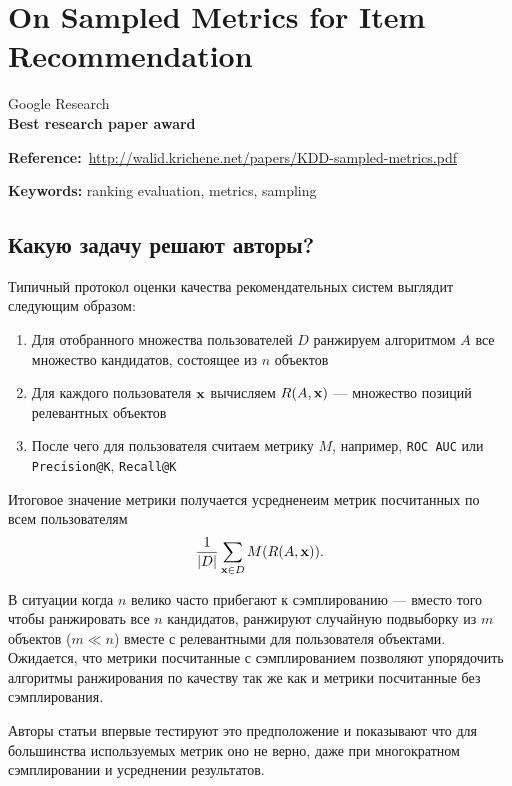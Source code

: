 \chapter{On Sampled Metrics for Item Recommendation}

Google Research \\

\textbf{Best research paper award}

\textbf{Reference:}~\url{http://walid.krichene.net/papers/KDD-sampled-metrics.pdf}

\textbf{Keywords:} ranking evaluation, metrics, sampling

\section*{Какую задачу решают авторы?}

Типичный протокол оценки качества рекомендательных систем выглядит следующим образом:
\begin{enumerate}
    \item Для отобранного множества пользователей $D$ ранжируем алгоритмом $A$ все множество кандидатов, состоящее из $n$ объектов
    \item Для каждого пользователя ${\bf x}$ вычисляем $R(A, {\bf x})$ --- множество позиций релевантных объектов
    \item После чего для пользователя считаем метрику $M$, например, \texttt{ROC AUC} или \texttt{Precision@K}, \texttt{Recall@K}
\end{enumerate}

Итоговое значение метрики получается усредненеим метрик посчитанных по всем пользователям
\begin{equation*}
    \frac{1}{|D|}\sum\limits_{{\bf x} \in D} M(R(A, {\bf x})) .
\end{equation*}

В ситуации когда $n$ велико часто прибегают к сэмплированию --- вместо того чтобы ранжировать все $n$ кандидатов, ранжируют случайную подвыборку из $m$ объектов ($ m \ll n $) вместе с релевантными для пользователя объектами. \\

Ожидается, что метрики посчитанные с сэмплированием позволяют упорядочить алгоритмы ранжирования по качеству так же как и метрики посчитанные без сэмплирования. 

Авторы статьи впервые тестируют это предположение и показывают что для большинства используемых метрик оно не верно, даже при многократном сэмплировании и усреднении результатов. \\

